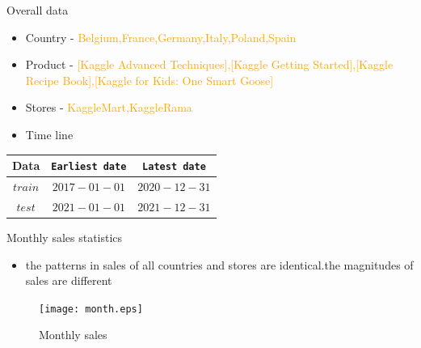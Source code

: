 \documentclass[
 size=14pt,
 paper=smartboard,  %
 mode=present, 		%
 display=slides, 	%
 style=tuliplab,  	%
 pauseslide,
 fleqn,leqno]{powerdot}
\begin{document}
\begin{slide}[toc=,bm=]{Overall data}

\begin{itemize}
\item
Country - \textcolor{orange} {Belgium,France,Germany,Italy,Poland,Spain}
\end{itemize}

\begin{itemize}
	\item
	Product - \textcolor{orange} {[Kaggle Advanced Techniques],[Kaggle Getting Started],[Kaggle Recipe Book],[Kaggle for Kids: One Smart Goose]}
\end{itemize}

\begin{itemize}
	\item
	Stores - \textcolor{orange} {KaggleMart,KaggleRama}
\end{itemize}

\begin{itemize}
	\item
	Time line
\end{itemize}

\begin{center}
	\begin{tabular}{c| c |c }
		\toprule
		Data & \texttt{Earliest date}  & \texttt{Latest date} \\
		\midrule
		$train$
		&  {$2017-01-01$} &  {$2020-12-31$} \\
		$test$
		&  {$2021-01-01$} &  {$2021-12-31$}  \\
		\bottomrule
	\end{tabular}
\end{center}


\end{slide}


\begin{slide}[toc=,bm=]{Monthly sales statistics}
\begin{itemize}
	\item
	the patterns in sales of all countries and stores are identical.the magnitudes of sales are different
\end{itemize}
\begin{figure}
  \centering
  \texttt{[image: month.eps]}
  \caption{Monthly sales}\label{fig:OutAspect-target}
\end{figure}
\end{slide}
\end{document}
